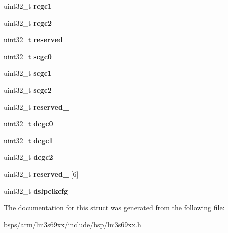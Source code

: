 \begin{DoxyCompactItemize}
uint32\+\_\+t {\bfseries rcgc1}
\item 
\mbox{\label{structlm3s69xx__syscon_a28528ac6d61fed0f37e67e10a15b9510}} 
uint32\+\_\+t {\bfseries rcgc2}
\item 
\mbox{\label{structlm3s69xx__syscon_ab40f8fad884242f8e962f8000fdc98ba}} 
uint32\+\_\+t {\bfseries reserved\+\_}
\item 
\mbox{\label{structlm3s69xx__syscon_a88289bab30c5d2a8d96843a541ab064f}} 
uint32\+\_\+t {\bfseries scgc0}
\item 
\mbox{\label{structlm3s69xx__syscon_a8237b24edc84f575d551ace4c788ac9b}} 
uint32\+\_\+t {\bfseries scgc1}
\item 
\mbox{\label{structlm3s69xx__syscon_af35b3f8e368fca1270f294ecceed9e55}} 
uint32\+\_\+t {\bfseries scgc2}
\item 
\mbox{\label{structlm3s69xx__syscon_aa7541b9cf9cee610c980323e6665949a}} 
uint32\+\_\+t {\bfseries reserved\+\_}
\item 
\mbox{\label{structlm3s69xx__syscon_af50baa903b2ea4ec58579ea88bba178a}} 
uint32\+\_\+t {\bfseries dcgc0}
\item 
\mbox{\label{structlm3s69xx__syscon_a309b644fbd70b0e5aa136391ee646060}} 
uint32\+\_\+t {\bfseries dcgc1}
\item 
\mbox{\label{structlm3s69xx__syscon_a28dc0f4fba6833a9a893f7578246d920}} 
uint32\+\_\+t {\bfseries dcgc2}
\item 
\mbox{\label{structlm3s69xx__syscon_ab7410d4b98f76d3e37c5f22ffff4fa93}} 
uint32\+\_\+t {\bfseries reserved\+\_} \mbox{[}6\mbox{]}
\item 
\mbox{\label{structlm3s69xx__syscon_af82f3ba81984e50b107878b077d13da8}} 
uint32\+\_\+t {\bfseries dslpclkcfg}
\end{DoxyCompactItemize}


The documentation for this struct was generated from the following file\+:\begin{DoxyCompactItemize}
\item 
bsps/arm/lm3s69xx/include/bsp/\mbox{\hyperlink{lm3s69xx_8h}{lm3s69xx.\+h}}\end{DoxyCompactItemize}
